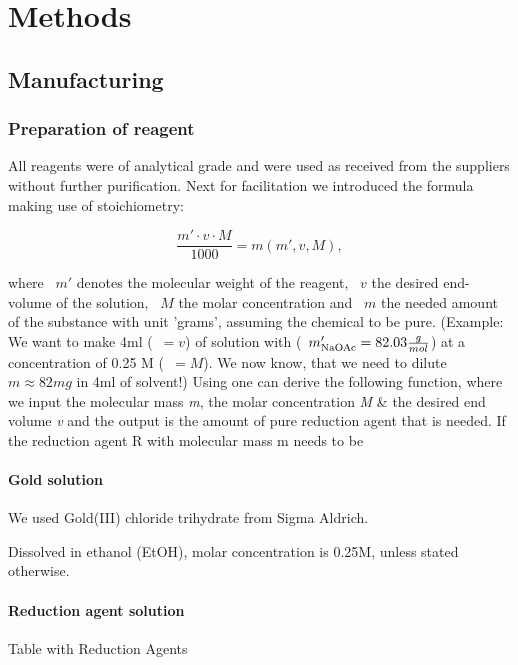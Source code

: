 \section{Methods}

\subsection{Manufacturing}

\subsubsection{Preparation of reagent}

All reagents were of analytical grade and were used as received from the suppliers without further purification. Next for facilitation we introduced the formula making use of stoichiometry:



    $$\frac{m'\cdot v\cdot M}{1000} = m(m',v,M), $$

where ~$m'$ denotes the molecular weight of the reagent, ~$v$ the desired end-volume of the solution, ~$M$ the molar concentration and ~$m$ the needed amount of the substance with unit 'grams', assuming the chemical to be pure. (Example: We want to make 4ml (~$= v$) of solution with  (~$m'_{\ce{NaOAc}}= 82.03 \frac{g}{mol}$) at a concentration of 0.25 M (~$= M$). We now know, that we need to dilute $m \approx 82mg$  in 4ml of solvent!) 
Using  one can derive the following function, where we input the molecular mass \textit{m}, the molar concentration \textit{M} \& the desired end volume \textit{v} and the output is the amount of pure reduction agent that is needed. 
If the reduction agent R with molecular mass m needs to be 


\paragraph{Gold solution}

We used Gold(III) chloride trihydrate from Sigma Aldrich. 

Dissolved in ethanol (EtOH), molar concentration is 0.25M, unless stated otherwise.

\paragraph{Reduction agent solution}


Table with Reduction Agents


